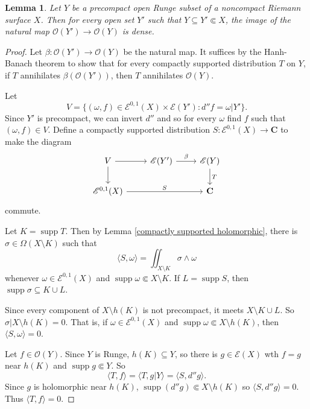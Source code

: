 \documentclass[reqno,12pt,letterpaper]{amsart}
\newcommand{\CC}{\mathbf{C}}
\DeclareMathOperator{\supp}{supp}
\newcommand{\Olo}{\mathscr O}
\newcommand{\Smooth}{\mathscr E}
\newtheorem{lemma}[theorem]{Lemma}
\theoremstyle{definition}
\begin{document}
\begin{lemma}
\label{Runge lemma}
Let $Y$ be a precompact open Runge subset of a noncompact Riemann surface $X$.
Then for every open set $Y'$ such that $Y \subseteq Y' \Subset X$, the image of the natural map $\Olo(Y') \to \Olo(Y)$ is dense.
\end{lemma}
\begin{proof}
Let $\beta: \Olo(Y') \to \Olo(Y)$ be the natural map.
It suffices by the Hanh-Banach theorem to show that for every compactly supported distribution $T$ on $Y$, if $T$ annihilates $\beta(\Olo(Y'))$, then $T$ annihilates $\Olo(Y)$.

Let
$$V = \{(\omega, f) \in \Smooth^{0,1}(X) \times \Smooth(Y'): d''f = \omega|Y'\}.$$
Since $Y'$ is precompact, we can invert $d''$ and so for every $\omega$ find $f$ such that $(\omega, f) \in V$.
Define a compactly supported distribution $S: \Smooth^{0,1}(X) \to \CC$ to make the diagram
$$\begin{tikzcd}
V \arrow[r] \arrow[d] & \Smooth(Y') \arrow[r,"\beta"] & \Smooth(Y) \arrow[d,"T"]\\
\Smooth^{0,1}(X) \arrow[rr,"S"] && \CC
\end{tikzcd}$$
commute.

Let $K = \supp T$. Then by Lemma \ref{compactly supported holomorphic}, there is $\sigma \in \Omega(X \setminus K)$ such that
$$\langle S, \omega\rangle = \iint_{X \setminus K} \sigma \wedge \omega$$
whenever $\omega \in \Smooth^{0,1}(X)$ and $\supp \omega \Subset X \setminus K$.
If $L = \supp S$, then $\supp \sigma \subseteq K \cup L$.

Since every component of $X \setminus h(K)$ is not precompact, it meets $X \setminus K \cup L$.
So $\sigma|X \setminus h(K) = 0$.
That is, if $\omega \in \Smooth^{0,1}(X)$ and $\supp \omega \Subset X \setminus h(K)$, then $\langle S, \omega\rangle = 0$.

Let $f \in \Olo(Y)$. Since $Y$ is Runge, $h(K) \subseteq Y$, so there is $g \in \Smooth(X)$ wth $f = g$ near $h(K)$ and $\supp g \Subset Y$.
So
$$\langle T, f\rangle = \langle T, g|Y\rangle = \langle S, d''g\rangle.$$
Since $g$ is holomorphic near $h(K)$, $\supp(d''g) \Subset X \setminus h(K)$ so $\langle S, d''g\rangle = 0$.
Thus $\langle T, f\rangle = 0$.
\end{proof}
\end{document}
